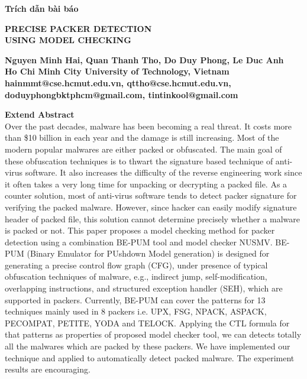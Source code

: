 \newpage
\begin{Large}
\textbf{Trích dẫn bài báo}
\end{Large}

\vspace{2cm}

\begin{Large}
\begin{center}
\textbf{PRECISE PACKER DETECTION\\ USING MODEL CHECKING}
\end{center}
\end{Large}

\vspace{1cm}

\begin{center}
\textbf
{
Nguyen Minh Hai, Quan Thanh Tho, Do Duy Phong, Le Duc Anh\\ 
Ho Chi Minh City University of Technology, Vietnam\\
hainmmt@cse.hcmut.edu.vn, qttho@cse.hcmut.edu.vn, doduyphongbktphcm@gmail.com, tintinkool@gmail.com
}
\end{center}

\vspace{1cm}

\textbf{Extend Abstract}\\
Over the past decades, malware has been becoming a real threat. It costs more than \$10 billion in each year and the damage is still increasing. Most of the modern popular malwares are either packed or obfuscated. The main goal of these obfuscation techniques is to thwart the signature based technique of anti-virus software. It also increases the difficulty of the reverse engineering work since it often takes a very long time for unpacking or decrypting a packed file. As a counter solution, most of anti-virus software tends to detect packer signature for verifying the packed malware. However, since hacker can easily modify signature header of packed file, this solution cannot determine precisely whether a malware is packed or not. This paper proposes a model checking method for packer detection using a combination BE-PUM tool and model checker NUSMV. BE-PUM (Binary Emulator for PUshdown Model generation) is designed for generating a precise control flow graph (CFG), under presence of typical obfuscation techniques of malware, e.g., indirect jump, self-modification, overlapping instructions, and structured exception handler (SEH), which are supported in packers. Currently, BE-PUM can cover the patterns for 13 techniques mainly used in 8 packers i.e. UPX, FSG, NPACK, ASPACK, PECOMPAT, PETITE, YODA and TELOCK. Applying the CTL formula for that patterns as properties of proposed model checker tool, we can detects totally all the malwares which are packed by these packers. We have implemented our technique and applied to automatically detect packed malware. The experiment results are encouraging.


